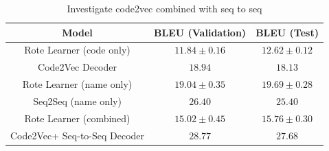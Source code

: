 \begin{table}[h!]
\begin{center}
\begin{tabular}{ c | c | c  }
    Model                             & BLEU (Validation)  & BLEU (Test)     \\
    \hline
    Rote Learner  (code only)        & $ 11.84 \pm  0.16 $ & $ 12.62 \pm 0.12 $ \\
    Code2Vec Decoder                 & $ 18.94 $ & $ 18.13 $ \\
    \hline
    \hline
    Rote Learner  (name only)         & $ 19.04 \pm  0.35 $ & $ 19.69 \pm 0.28 $ \\
    Seq2Seq (name only)               & $ 26.40 $ & $ 25.40 $ \\
    \hline
    \hline
    Rote Learner (combined)            & $ 15.02 \pm  0.45 $ & $ 15.76 \pm 0.30$ \\
    Code2Vec+ Seq-to-Seq Decoder       & $ 28.77 $ & $ 27.68 $ \\
    \hline
\end{tabular}
\caption {Investigate code2vec combined with seq to seq}
\label{table:code2vec_embed}
\end{center}
\end{table}

